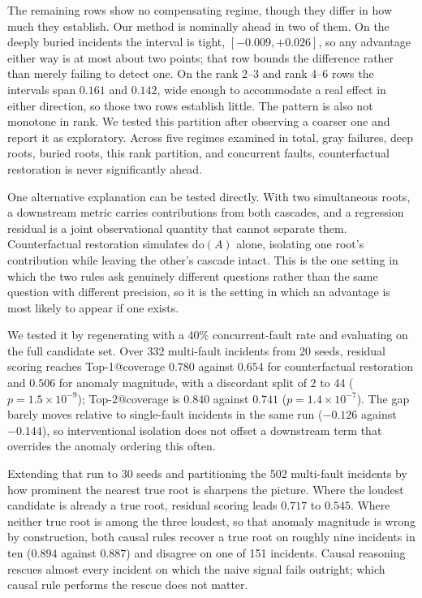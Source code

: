 \documentclass[conference]{IEEEtran}
\begin{document}
The remaining rows show no compensating regime, though they differ in how much they establish. Our method is nominally ahead in two of them. On the deeply buried incidents the interval is tight, $[-0.009,+0.026]$, so any advantage either way is at most about two points; that row bounds the difference rather than merely failing to detect one. On the rank 2--3 and rank 4--6 rows the intervals span $0.161$ and $0.142$, wide enough to accommodate a real effect in either direction, so those two rows establish little. The pattern is also not monotone in rank. We tested this partition after observing a coarser one and report it as exploratory. Across five regimes examined in total, gray failures, deep roots, buried roots, this rank partition, and concurrent faults, counterfactual restoration is never significantly ahead.

One alternative explanation can be tested directly. With two simultaneous roots, a downstream metric carries contributions from both cascades, and a regression residual is a joint observational quantity that cannot separate them. Counterfactual restoration simulates $\mathrm{do}(A)$ alone, isolating one root's contribution while leaving the other's cascade intact. This is the one setting in which the two rules ask genuinely different questions rather than the same question with different precision, so it is the setting in which an advantage is most likely to appear if one exists.

We tested it by regenerating with a 40\% concurrent-fault rate and evaluating on the full candidate set. Over 332 multi-fault incidents from 20 seeds, residual scoring reaches Top-1@coverage $0.780$ against $0.654$ for counterfactual restoration and $0.506$ for anomaly magnitude, with a discordant split of 2 to 44 ($p=1.5\times10^{-9}$); Top-2@coverage is $0.840$ against $0.741$ ($p=1.4\times10^{-7}$). The gap barely moves relative to single-fault incidents in the same run ($-0.126$ against $-0.144$), so interventional isolation does not offset a downstream term that overrides the anomaly ordering this often.

Extending that run to 30 seeds and partitioning the 502 multi-fault incidents by how prominent the nearest true root is sharpens the picture. Where the loudest candidate is already a true root, residual scoring leads $0.717$ to $0.545$. Where neither true root is among the three loudest, so that anomaly magnitude is wrong by construction, both causal rules recover a true root on roughly nine incidents in ten ($0.894$ against $0.887$) and disagree on one of 151 incidents. Causal reasoning rescues almost every incident on which the naive signal fails outright; which causal rule performs the rescue does not matter.
\end{document}
